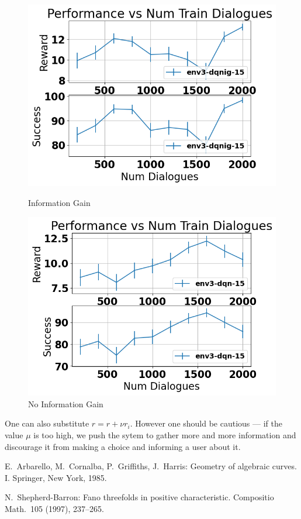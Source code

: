 \documentclass[12pt,titlepage,a4paper]{article}
\begin{document}
\begin{figure}[!htb]
      \includegraphics[width=\linewidth]{env3-ig-CamRestaurants.png}
      \caption{Information Gain}
    \endminipage\hfill
      \includegraphics[width=\linewidth]{env3-CamRestaurants.png}
      \caption{No Information Gain}
    \endminipage
\end{figure}

One can also substitute $r = r + \nu r_i$. However one should be cautious --- if the value $\mu$ is too high, we push the sytem to gather more and more information and discourage it from making a choice and informing a user about it. 

\pagebreak
\begin{thebibliography}{ccccc}

E.\ Arbarello, M.\ Cornalba, P.\ Griffiths, J.\ Harris:
Geometry of algebraic curves. I. 
Springer, New York, 1985.

N.\ Shepherd-Barron:
Fano threefolds in positive characteristic.
Compositio Math.\  105  (1997),  237--265.

\end{thebibliography}
\end{document}
